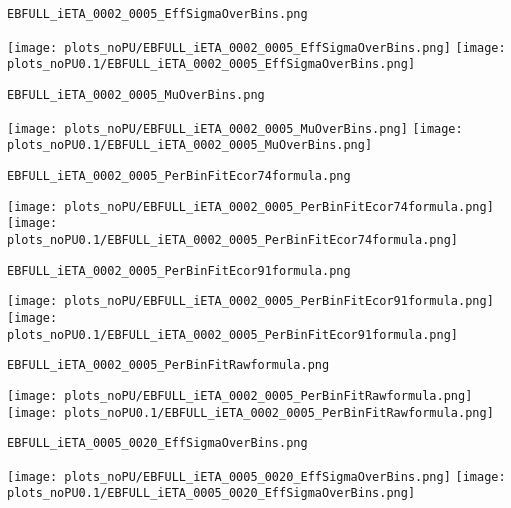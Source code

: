 \begin{frame}[fragile]
\begin{verbatim}
EBFULL_iETA_0002_0005_EffSigmaOverBins.png
\end{verbatim}
\texttt{[image: plots\_noPU/EBFULL\_iETA\_0002\_0005\_EffSigmaOverBins.png]}
\texttt{[image: plots\_noPU0.1/EBFULL\_iETA\_0002\_0005\_EffSigmaOverBins.png]}
\end{frame}
\begin{frame}[fragile]
\begin{verbatim}
EBFULL_iETA_0002_0005_MuOverBins.png
\end{verbatim}
\texttt{[image: plots\_noPU/EBFULL\_iETA\_0002\_0005\_MuOverBins.png]}
\texttt{[image: plots\_noPU0.1/EBFULL\_iETA\_0002\_0005\_MuOverBins.png]}
\end{frame}
\begin{frame}[fragile]
\begin{verbatim}
EBFULL_iETA_0002_0005_PerBinFitEcor74formula.png
\end{verbatim}
\texttt{[image: plots\_noPU/EBFULL\_iETA\_0002\_0005\_PerBinFitEcor74formula.png]}
\texttt{[image: plots\_noPU0.1/EBFULL\_iETA\_0002\_0005\_PerBinFitEcor74formula.png]}
\end{frame}
\begin{frame}[fragile]
\begin{verbatim}
EBFULL_iETA_0002_0005_PerBinFitEcor91formula.png
\end{verbatim}
\texttt{[image: plots\_noPU/EBFULL\_iETA\_0002\_0005\_PerBinFitEcor91formula.png]}
\texttt{[image: plots\_noPU0.1/EBFULL\_iETA\_0002\_0005\_PerBinFitEcor91formula.png]}
\end{frame}
\begin{frame}[fragile]
\begin{verbatim}
EBFULL_iETA_0002_0005_PerBinFitRawformula.png
\end{verbatim}
\texttt{[image: plots\_noPU/EBFULL\_iETA\_0002\_0005\_PerBinFitRawformula.png]}
\texttt{[image: plots\_noPU0.1/EBFULL\_iETA\_0002\_0005\_PerBinFitRawformula.png]}
\end{frame}
\begin{frame}[fragile]
\begin{verbatim}
EBFULL_iETA_0005_0020_EffSigmaOverBins.png
\end{verbatim}
\texttt{[image: plots\_noPU/EBFULL\_iETA\_0005\_0020\_EffSigmaOverBins.png]}
\texttt{[image: plots\_noPU0.1/EBFULL\_iETA\_0005\_0020\_EffSigmaOverBins.png]}
\end{frame}
